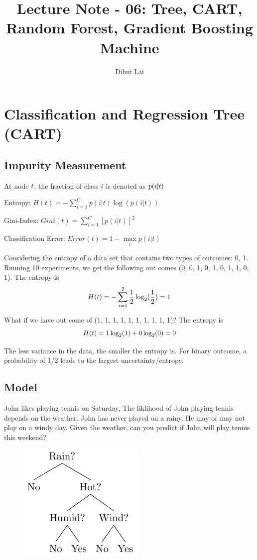 \documentclass[12pt, oneside]{article}
\title{Lecture Note - 06: Tree, CART, Random Forest, Gradient Boosting Machine}
\author{Dihui Lai}
\begin{document}
\maketitle
\tableofcontents

\vspace{.25in}


\section{Classification and Regression Tree (CART)}

\subsection{Impurity Measurement}
At node $\mathnormal{t}$, the fraction of class $\mathnormal{i}$ is denoted as $\mathnormal{p(i|t)}$
    
Entropy: $H(t)=-\sum\limits_{i=1}^{C}p(i|t)\log(p(i|t))$
    
Gini-Index: $Gini(t)=\sum\limits_{i=1}^{C}[p(i|t)]^2$
    
Classification Error: $Error(t)=1-\max\limits_{i}p(i|t)$

Considering the entropy of a data set that contains two types of outcomes: {0, 1}. Running 10 experiments, we get the following out comes (0, 0, 1, 0, 1, 0, 1, 1, 0, 1). The entropy is 
$$
\mathnormal{ H(t)}=-\sum\limits_{i=1}^{2}\frac{1}{2}\log_2(\frac{1}{2})=1
$$
    
What if we have out come of (1, 1, 1, 1, 1, 1, 1, 1, 1, 1)? The entropy is 
$$
\mathnormal{H(t)}=1\log_2(1)+0\log_2(0)=0
$$

The less variance in the data, the smaller the entropy is. For binary outcome, a probability of 1/2 leads to the largest uncertainty/entropy.

\subsection{Model}
John likes playing tennis on Saturday, The liklihood of John playing tennis depends on the weather. John has never played on a rainy. He may or may not play on a windy day. Given the weather, can you predict if John will play tennis this weekend?

\begin{figure}
\center
\includegraphics[scale=1.2,page=1]{Figures/CART.pdf}
\end{figure}
\end{document}

